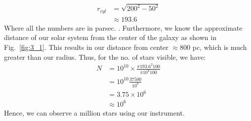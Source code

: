 \documentclass{article}
\begin{document}
\begin{equation}
\begin{split}
r_{cyl} &= \sqrt{200^2-50^2} \\
&\approx 193.6
\end{split}
\end{equation}
Where all the numbers are in parsec. . Furthermore, we know the approximate distance of our solar system from the center of the galaxy as shown in Fig.~\ref{fig:3_1}. This results in our distance from center $\approx 800$ pc, which is much greater than our radius. Thus, for the no. of stars visible, we have:
\begin{equation}
\begin{split}
N & = 10^{10}\times\frac{\pi 193.6^2 100}{\pi 10^8 100} \\
&=10^{10}\frac{37500}{10^8} \\
&=3.75\times10^{6} \\
&\approx 10^6
\end{split}
\end{equation}
Hence, we can observe a million stars using our instrument.
\end{document}
